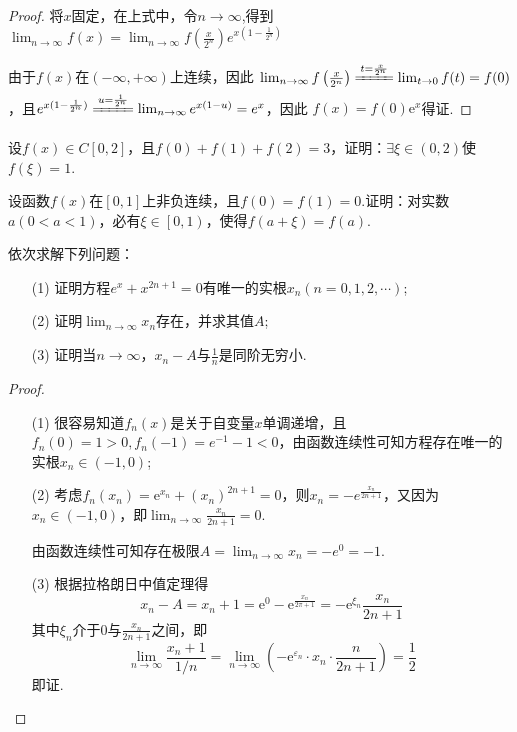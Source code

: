 \begin{xiti}
\begin{proof}
	将$x$固定，在上式中，令$n \rightarrow \infty$,得到
	$\lim_{n \rightarrow \infty}f(x)=\lim_{n \rightarrow \infty}f(\frac{x}{2^{n}})e^{x(1-\frac{1}{2^n})}$
	
	由于$f(x)$在$(-\infty,+\infty)$上连续，因此
	$\lim _{n \rightarrow \infty} f\left(\frac{x}{2^{n}}\right)\xlongequal[\qquad]{t=\frac{x}{2^{n}}} \lim _{t \rightarrow 0} f(t)=f(0)$，且$e^{x(1-\frac{1}{2^n})}\xlongequal[\qquad]{u=\frac{1}{2^n}}\lim_{n \rightarrow \infty}e^{x(1-u)}=e^x$，因此 $f(x)=f(0)\mathrm{e}^{x}$得证.
\end{proof}
\item 设$f ( x ) \in C [ 0,2 ]$，且$f ( 0 ) + f ( 1 ) + f ( 2 ) = 3$，证明：$\exists \xi \in ( 0,2 )$使$f(\xi)=1$.
\item 设函数$f(x)$在$[0,1]$上非负连续，且$f(0)=f(1)=0$.证明：对实数$a(0<a<1)$，必有$\xi \in \left[ 0,1\right) $，使得$f(a+\xi )=f(a)$.
\item 依次求解下列问题：
\begin{enumerate}
	\item [(1)] 证明方程$e ^ { x } + x ^ { 2 n + 1 } = 0$有唯一的实根$x_{n}(n=0,1,2,\cdots)$;
	\item [(2)]证明$\lim_{ n \rightarrow \infty }x_{n}$存在，并求其值$A$;
	\item [(3)]证明当$n\rightarrow \infty$，$x_{n}-A$与$\frac{1}{n}$是同阶无穷小.
\end{enumerate}
\begin{proof}
	\begin{enumerate}
		\item [(1)] 很容易知道$f_{n}(x)$是关于自变量$x$单调递增，且$f_{n}(0)=1>0, f_{n}(-1)=e^{-1}-1<0$，由函数连续性可知方程存在唯一的实根$x_{n}\in (-1,0)$;
		\item [(2)]考虑$f_{n}\left(x_{n}\right)=\mathrm{e}^{x_{n}}+\left(x_{n}\right)^{2 n+1}=0$，则$x_{n}=-e^{\frac{x_{n}}{2n+1}}$，又因为$x_{n}\in (-1,0)$，即$\lim _{n \rightarrow \infty} \frac{x_{n}}{2 n+1}=0$.
		
		由函数连续性可知存在极限$A=\lim _{n \rightarrow \infty} x_{n}=-e^{0}=-1$.
		\item [(3)]根据拉格朗日中值定理得
		\[
		x_{n}-A=x_{n}+1=\mathrm{e}^{0}-\mathrm{e}^{\frac{x_{n}}{2 \pi+1}}=-\mathrm{e}^{\xi_{n}} \frac{x_{n}}{2 n+1}
		\]
		其中$\xi _{n}$介于$0$与$\frac{x_{n}}{2 n+1}$之间，即
		\[
		\lim _{n \rightarrow \infty} \frac{x_{n}+1}{1 / n}=\lim _{n \rightarrow \infty}\left(-\mathrm{e}^{\varepsilon_{n}} \cdot x_{n} \cdot \frac{n}{2 n+1}\right)=\frac{1}{2}
		\]
		即证.
	\end{enumerate}
	

\end{proof}
\end{xiti}
